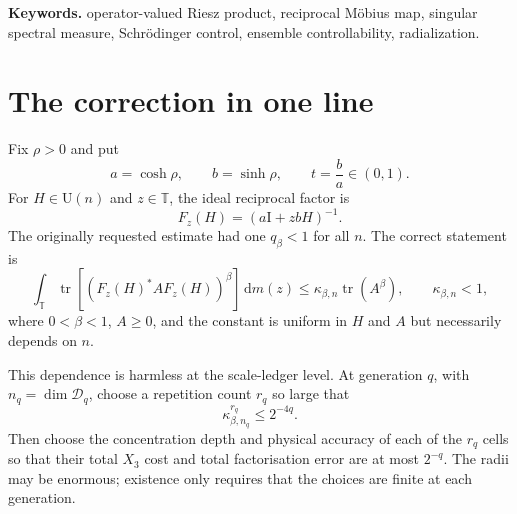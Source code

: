 \documentclass[11pt]{article}
\theoremstyle{remark}
\newcommand{\T}{\mathbb T}
\newcommand{\Id}{\mathrm I}
\newcommand{\dd}{\,\mathrm d}
\newcommand{\tr}{\operatorname{tr}}
\newcommand{\U}{\mathrm U}
\begin{document}
\noindent\textbf{Keywords.}
operator-valued Riesz product, reciprocal M\"obius map, singular spectral
measure, Schr\"odinger control, ensemble controllability, radialization.

\medskip
\noindent
{}

\section{The correction in one line}

Fix $\rho>0$ and put
\begin{equation}
 a=\cosh\rho,\qquad b=\sinh\rho,\qquad t=\frac ba\in(0,1).
 \label{eq:ab}
\end{equation}
For $H\in\U(n)$ and $z\in\T$, the ideal reciprocal factor is
\begin{equation}
 F_z(H)=(a\Id+zbH)^{-1}.
 \label{eq:F}
\end{equation}
The originally requested estimate had one $q_\beta<1$ for all $n$.
The correct statement is
\begin{equation}
 \int_\T \tr\!\left[(F_z(H)^*AF_z(H))^\beta\right]\dd m(z)
 \leq \kappa_{\beta,n}\tr(A^\beta),
 \qquad \kappa_{\beta,n}<1,
 \label{eq:correct-contraction}
\end{equation}
where $0<\beta<1$, $A\geq0$, and the constant is uniform in $H$ and $A$
but necessarily depends on $n$.

This dependence is harmless at the scale-ledger level.  At generation $q$,
with $n_q=\dim\mathcal D_q$, choose a repetition count $r_q$ so large that
\begin{equation}
 \kappa_{\beta,n_q}^{r_q}\leq 2^{-4q}.
 \label{eq:repeat}
\end{equation}
Then choose the concentration depth and physical accuracy of each of the
$r_q$ cells so that their total $X_3$ cost and total factorisation error are
at most $2^{-q}$.  The radii may be enormous; existence only requires that
the choices are finite at each generation.
\end{document}
